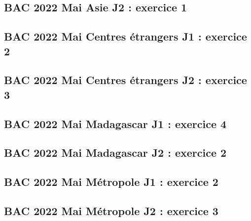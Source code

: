 \documentclass[lang=fr,edition=teacher,layout=sheet]{mxbook}
\begin{document}
\begingroup\endgroup
\par\bigskip
{}\subsection*{BAC 2022 Mai Asie J2 : exercice 1}
\begingroup\endgroup
\par\bigskip
{}\subsection*{BAC 2022 Mai Centres étrangers J1 : exercice 2}
\begingroup\endgroup
\par\bigskip
{}\subsection*{BAC 2022 Mai Centres étrangers J2 : exercice 3}
\begingroup\endgroup
\par\bigskip
{}\subsection*{BAC 2022 Mai Madagascar J1 : exercice 4}
\begingroup\endgroup
\par\bigskip
{}\subsection*{BAC 2022 Mai Madagascar J2 : exercice 2}
\begingroup\endgroup
\par\bigskip
{}\subsection*{BAC 2022 Mai Métropole J1 : exercice 2}
\begingroup\endgroup
\par\bigskip
{}\subsection*{BAC 2022 Mai Métropole J2 : exercice 3}
\end{document}

